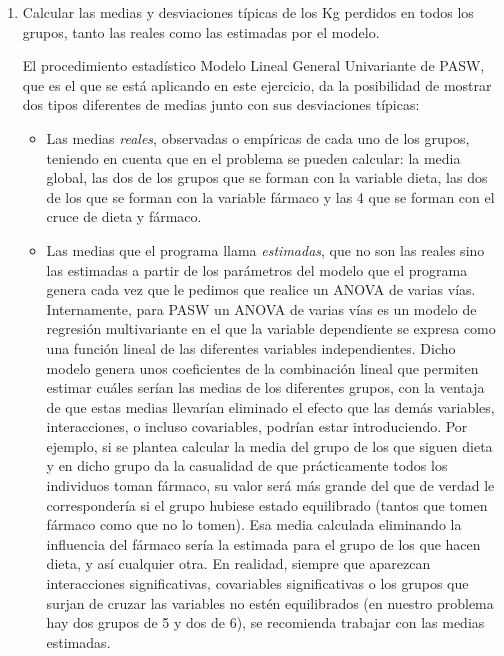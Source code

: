 \begin{enumerate}
\begin{enumerate}
\item Calcular las medias y desviaciones típicas de los Kg perdidos en todos los grupos, tanto las reales como las estimadas por el modelo.

\begin{indicacion}{El procedimiento estadístico Modelo Lineal General Univariante de PASW, que es el que se está aplicando en este ejercicio, da la posibilidad de mostrar dos tipos diferentes de medias junto con sus desviaciones típicas:

\begin{itemize}
\item Las medias \emph{reales}, observadas o empíricas de cada uno de los grupos, teniendo en cuenta que en el problema se pueden calcular: la media global, las dos de los grupos que se forman con la variable dieta, las dos de los que se forman con la variable fármaco y las 4 que se forman con el cruce de dieta y fármaco.

\item Las medias que el programa llama \emph{estimadas}, que no son las reales sino las estimadas a partir de los parámetros del modelo que el programa genera cada vez que le pedimos que realice un ANOVA de varias vías. Internamente, para PASW un ANOVA de varias vías es un modelo de regresión multivariante en el que la variable dependiente se expresa como una función lineal de las diferentes variables independientes. Dicho modelo genera unos coeficientes de la combinación lineal que permiten estimar cuáles serían las medias de los diferentes grupos, con la ventaja de que estas medias llevarían eliminado el efecto que las demás variables, interacciones, o incluso covariables, podrían estar introduciendo. Por ejemplo, si se plantea calcular la media del grupo de los que siguen dieta y en dicho grupo da la casualidad de que prácticamente todos los individuos toman fármaco, su valor será más grande del que de verdad le correspondería si el grupo hubiese estado equilibrado (tantos que tomen fármaco como que no lo tomen). Esa media calculada eliminando la influencia del fármaco sería la estimada para el grupo de los que hacen dieta, y así cualquier otra. En realidad, siempre que aparezcan interacciones significativas, covariables significativas o los grupos que surjan de cruzar las variables no estén equilibrados (en nuestro problema hay dos grupos de 5 y dos de 6), se recomienda trabajar con las medias estimadas.


\end{itemize}

}
\end{indicacion}
\end{enumerate}
\end{enumerate}
